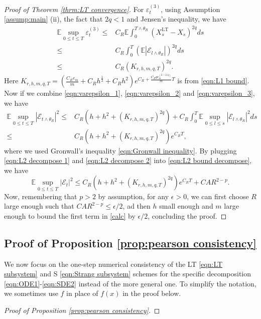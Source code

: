 \documentclass[a4paper,12pt]{article}
\numberwithin{equation}{section}
\theoremstyle{plain}
\theoremstyle{definition}
\begin{document}
\begin{appendix}
\begin{proof}[Proof of Theorem \ref{thrm:LT convergence}]
For $\varepsilon^{(3)}_t$, using Assumption \ref{assump:main} (ii), the fact that $2q<1$ and Jensen's inequality, we have
\begin{align}
    \mathbb{E}\sup_{0\leq t \leq T}\varepsilon^{(3)}_t\leq& C_R\mathbb{E}\int_0^{T\wedge \theta_R}\left(X^{\textrm{LT}}_s-X_s\right)^{2q}ds\nonumber\\
    \leq&C_R\int_0^{T}\left(\mathbb{E}\left|\mathcal{E}_{l\wedge \theta_R}\right|\right)^{2q}ds\nonumber\\
    \leq&C_R(K_{r,h,m,q,T})^{2q}\label{eqn:varepsilon_3}.
\end{align}
Here $K_{r,h,m,q,T}=\left(\frac{C_Re_m}{m}+C_Rh^{\frac{1}{2}}+C_Rh^{2}\right)e^{C_R+\frac{C_Rqe_m^{(2-2/q)}}{m}T}$ is from \eqref{eqn:L1 bound}. Now if we combine \eqref{eqn:varepsilon_1}, \eqref{eqn:varepsilon_2} and \eqref{eqn:varepsilon_3}, we have
\begin{align}
    \mathbb{E} \sup _{0 \leq t \leq T}\left|\mathcal{E}_{t \wedge \theta_R}\right|^2\leq& C_R\left(h+h^2+(K_{r,h,m,q,T})^{2q}\right)+C_R\int_{0}^T\mathbb{E}\sup_{0\leq l\leq s}\left|\mathcal{E}_{l\wedge \theta_R}\right|^2ds\nonumber\\
    \leq& C_R\left(h+h^2+(K_{r,h,m,q,T})^{2q}\right)e^{C_RT},\label{eqn:L2 decompose 2}
\end{align}
where we used Gronwall's inequality \eqref{eqn:Gronwall inequality}.
By plugging \eqref{eqn:L2 decompose 1} and \eqref{eqn:L2 decompose 2} into \eqref{eqn:L2 bound decompose}, we have 
\begin{equation}\label{calc}
    \mathbb{E}\sup_{0\leq t\leq T}\left|\mathcal{E}_t\right|^2\leq C_R\left(h+h^2+(K_{r,h,m,q,T})^{2q}\right)e^{C_RT}+CAR^{2-p}.
\end{equation}
Now, remembering that $p>2$ by assumption, for any $\epsilon>0$, we can first choose $R$ large enough such that $CAR^{2-p}\leq \epsilon/2$, ad then $h$ small enough and $m$ large enough to bound the first term in \eqref{calc}
by $\epsilon/2$, concluding the proof.
\end{proof}

\subsection{Proof of Proposition \ref{prop:pearson consistency}}\label{ProofProp4.5}
We now focus on the one-step numerical consistency of the LT \eqref{eqn:LT subsystem} and S \eqref{eqn:Strang subsystem} schemes for the specific decomposition \eqref{eqn:ODE1}-\eqref{eqn:SDE2} instead of the more general one. To simplify the notation, we sometimes use $f$ in place of $f(x)$ in the proof below.
\begin{proof}[Proof of Proposition \ref{prop:pearson consistency}] 
   

\end{proof}
\end{appendix}
\end{document}
